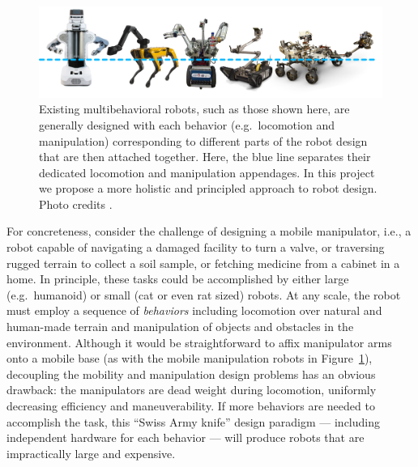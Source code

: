 \documentclass[11pt]{article}
\begin{document}
\begin{figure}[b]
    \vspace{0.05cm}
    \centering
    \includegraphics[width=0.9\columnwidth]{combined.png}
\caption{Existing multibehavioral robots, such as those shown here, are generally designed with each behavior (e.g.\ locomotion and manipulation) corresponding to different parts of the robot design that are then attached together. Here, the blue line separates their dedicated locomotion and manipulation appendages. In this project we propose a more holistic and principled approach to robot design. Photo credits \cite{PR2,SpotMini,srinivasa2012herb,PackBot,Mars2020}.
}
    \label{fig:robots}
\end{figure}

For concreteness, consider the challenge of designing a mobile manipulator,
i.e., 
a robot capable of
navigating a damaged facility to turn a valve, 
or
traversing rugged terrain to collect a soil sample, 
or 
fetching medicine from a cabinet in a home. 
In principle, these tasks could be accomplished by either large (e.g.\ humanoid) or small (cat or even rat sized) robots.
At any scale, the robot must employ a sequence of \emph{behaviors} including
locomotion over natural and human-made terrain 
and 
manipulation of objects and obstacles in the environment.
Although it would be straightforward to affix manipulator arms onto a mobile base (as with the mobile manipulation robots in Figure~\ref{fig:robots}), 
decoupling the mobility and manipulation design problems has an obvious drawback:  
the manipulators are dead weight during locomotion, uniformly decreasing efficiency and maneuverability.
If more behaviors are needed to accomplish the task, this ``Swiss Army knife'' design paradigm --- including independent hardware for each behavior --- will produce robots that are impractically large
and expensive.
\end{document}

